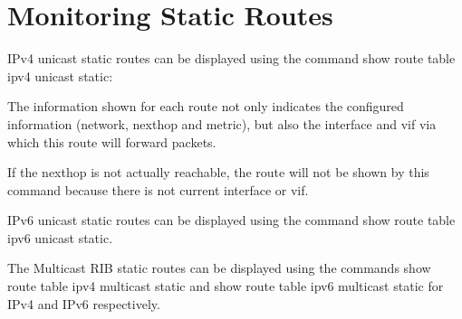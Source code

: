 \section{Monitoring Static Routes}

IPv4 unicast static routes can be displayed using the command {\stt show route
table ipv4 unicast static}:

\vspace{0.1in}
\noindent{}

\vspace{0.1in} 
The information shown for each route not only indicates the configured
information (network, nexthop and metric), but also the interface
and vif via which this route will forward packets.

If the nexthop is not actually reachable, the route will not be shown
by this command because there is not current interface or vif.

\vspace{0.2in}
IPv6 unicast static routes can be displayed using the command {\stt show route
table ipv6 unicast static}.

The Multicast RIB static routes can be displayed using the commands
{\stt show route table ipv4 multicast static} and
{\stt show route table ipv6 multicast static} for IPv4 and IPv6 respectively.
